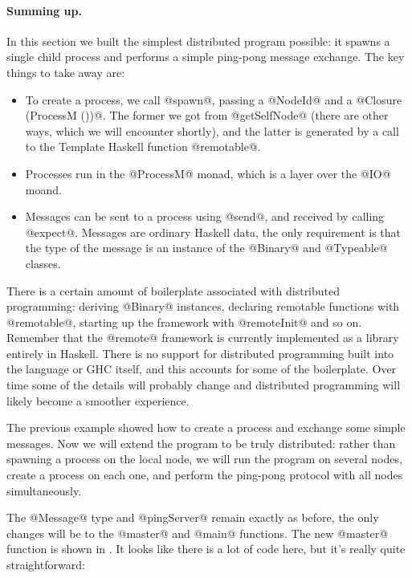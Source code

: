 \paragraph{Summing up.} In this section we built the simplest
distributed program possible: it spawns a single child process and
performs a simple ping-pong message exchange.  The key things to take
away are:

\begin{itemize}
\item To create a process, we call @spawn@, passing a @NodeId@ and a
  @Closure (ProcessM ())@.  The former we got from @getSelfNode@
  (there are other ways, which we will encounter shortly), and the
  latter is generated by a call to the Template Haskell function
  @remotable@.

\item Processes run in the @ProcessM@ monad, which is a layer over
  the @IO@ moand.

\item Messages can be sent to a process using @send@, and received by
  calling @expect@.  Messages are ordinary Haskell data, the only
  requirement is that the type of the message is an instance of the
  @Binary@ and @Typeable@ classes.
\end{itemize}

There is a certain amount of boilerplate associated with distributed
programming: deriving @Binary@ instances, declaring remotable
functions with @remotable@, starting up the framework with
@remoteInit@ and so on.  Remember that the @remote@ framework is
currently implemented as a library entirely in Haskell. There is no
support for distributed programming built into the language or GHC
itself, and this accounts for some of the boilerplate.  Over time some
of the details will probably change and distributed programming will
likely become a smoother experience.


The previous example showed how to create a process and exchange some
simple messages.  Now we will extend the program to be truly
distributed: rather than spawning a process on the local node, we will
run the program on several nodes, create a process on each one, and
perform the ping-pong protocol with all nodes simultaneously.

The @Message@ type and @pingServer@ remain exactly as before, the only
changes will be to the @master@ and @main@ functions.  The new
@master@ function is shown in .  It looks like
there is a lot of code here, but it's really quite straightforward:

